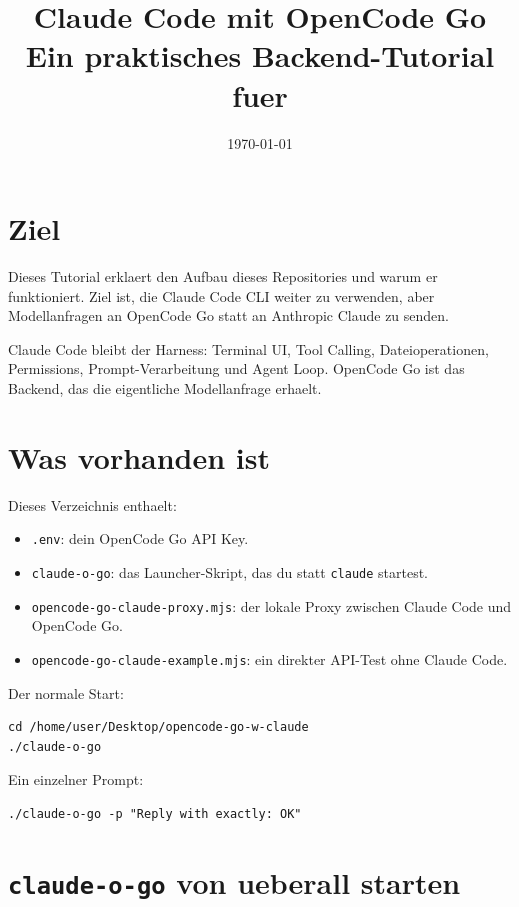 \documentclass[11pt,a4paper]{article}
\title{\Huge Claude Code mit OpenCode Go\\[0.4em]\Large Ein praktisches Backend-Tutorial fuer \code{claude-o-go}}
\author{\code{claude-o-go}}
\date{\today}
\newcommand{\code}[1]{\texttt{#1}}
\begin{document}
\maketitle
\tableofcontents
\newpage

\section{Ziel}

Dieses Tutorial erklaert den Aufbau dieses Repositories und warum er
funktioniert. Ziel ist, die Claude Code CLI weiter zu verwenden, aber
Modellanfragen an OpenCode Go statt an Anthropic Claude zu senden.

Claude Code bleibt der Harness: Terminal UI, Tool Calling, Dateioperationen,
Permissions, Prompt-Verarbeitung und Agent Loop. OpenCode Go ist das Backend,
das die eigentliche Modellanfrage erhaelt.

\section{Was vorhanden ist}

Dieses Verzeichnis enthaelt:

\begin{itemize}
  \item \code{.env}: dein OpenCode Go API Key.
  \item \code{claude-o-go}: das Launcher-Skript, das du statt \code{claude} startest.
  \item \code{opencode-go-claude-proxy.mjs}: der lokale Proxy zwischen Claude Code und OpenCode Go.
  \item \code{opencode-go-claude-example.mjs}: ein direkter API-Test ohne Claude Code.
\end{itemize}

Der normale Start:

\begin{verbatim}
cd /home/user/Desktop/opencode-go-w-claude
./claude-o-go
\end{verbatim}

Ein einzelner Prompt:

\begin{verbatim}
./claude-o-go -p "Reply with exactly: OK"
\end{verbatim}

\section{\code{claude-o-go} von ueberall starten}
\end{document}
